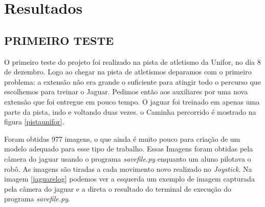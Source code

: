 \chapter{Resultados}

\section{PRIMEIRO TESTE}
\label{primeiro_teste}
O primeiro teste do projeto foi realizado na pista de atletismo da Unifor, no dia 8 de dezembro.
Logo ao chegar na pista de atletismos deparamos com o primeiro problema: a extensão não era grande o suficiente para atingir todo o percurso que escolhemos para treinar o Jaguar. Pedimos então aos auxiliares por uma nova extensão que foi entregue em pouco tempo. O jaguar foi treinado em apenas uma parte da pista, indo e voltando duas vezes. o Caminha percorrido é mostrado na figura \ref{pistaunifor}.

	\begin{figure}[H]
		\centering
\end{figure}

Foram obtidas 977 imagens, o que ainda é muito pouco para criação de um modelo adequado para esse tipo de trabalho. Essas Imagens foram obtidas pela câmera do jaguar usando o programa \textit{savefile.py} enquanto um aluno pilotava o robô. As imagens são tiradas a cada movimento novo realizado no \textit{Joystick}. Na imagem \ref{jaguarelog} podemos ver a esquerda um exemplo de imagem capturada pela câmera do jaguar e a direta o resultado do terminal de execução do programa \textit{savefile.py}.

